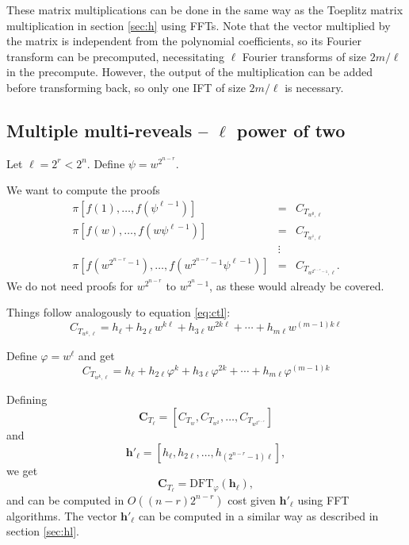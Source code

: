 \documentclass[a4paper]{article}
\begin{document}
These matrix multiplications can be done in the same way as the Toeplitz matrix multiplication in section \ref{sec:h} using FFTs. Note that the vector multiplied by the matrix is independent from the polynomial coefficients, so its Fourier transform can be precomputed, necessitating $\ell$ Fourier transforms of size $2m/\ell$ in the precompute. However, the output of the multiplication can be added before transforming back, so only one IFT of size $2m/\ell$ is necessary.

\subsection{Multiple multi-reveals -- $\ell$ power of two}

Let $\ell=2^r<2^n$. Define $\psi=w^{2^{n-r}}$.

We want to compute the proofs
\begin{eqnarray}
     \pi[f(1), \ldots, f(\psi^{\ell-1})] &=& C_{T_{w^0, \ell}} \\
     \pi[f(w), \ldots, f(w\psi^{\ell-1})] &=& C_{T_{w^1, \ell}} \\
     &\vdots& \nonumber \\
     \pi[f(w^{2^{n-r}-1}), \ldots, f(w^{2^{n-r}-1}\psi^{\ell-1})] &=& C_{T_{w^{2^{n-r}-1}, \ell}} \text{.}
\end{eqnarray}
We do not need proofs for $w^{2^{n-r}}$ to $w^{2^{n}-1}$, as these would already be covered.

Things follow analogously to equation \eqref{eq:ctl}:
\begin{equation}
     C_{T_{w^k,\ell}} = h_\ell + h_{2\ell}w^{k\ell} + h_{3\ell}w^{2k\ell}+\cdots + h_{m\ell}w^{(m-1)k\ell}
\end{equation}

Define $\varphi=w^\ell$ and get
\begin{equation}\label{eq:ctle}
     C_{T_{w^k,\ell}} = h_\ell + h_{2\ell}\varphi^{k} + h_{3\ell}\varphi^{2k}+\cdots + h_{m\ell}\varphi^{(m-1)k}
\end{equation}

Defining
$$
\mathbf{C}_{T_\ell} = [C_{T_{w}},C_{T_{w^{2}}},\ldots,C_{T_{w^{2^{n-r}}}}]
$$
and
$$
\mathbf{h'_\ell} = [h_\ell, h_{2\ell},\ldots,h_{(2^{n-r}-1)\ell}],
$$
we get
\begin{equation}
 \mathbf{C}_{T_\ell} = \mathrm{DFT}_\varphi(\mathbf{h_\ell}), 
\end{equation}
and can be computed in $O((n-r)2^{n-r})$ cost given $\mathbf{h'_\ell}$ using FFT algorithms. The vector $\mathbf{h'_\ell}$ can be computed in a similar way as described in section \ref{sec:hl}.
\end{document}
